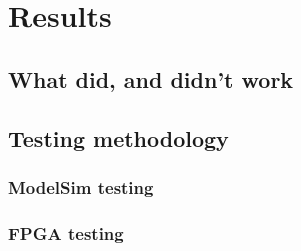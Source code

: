 \newpage
\chapter{Results}

\section{What did, and didn't work}


\section{Testing methodology}


\subsection{ModelSim testing}


\subsection{FPGA testing}

